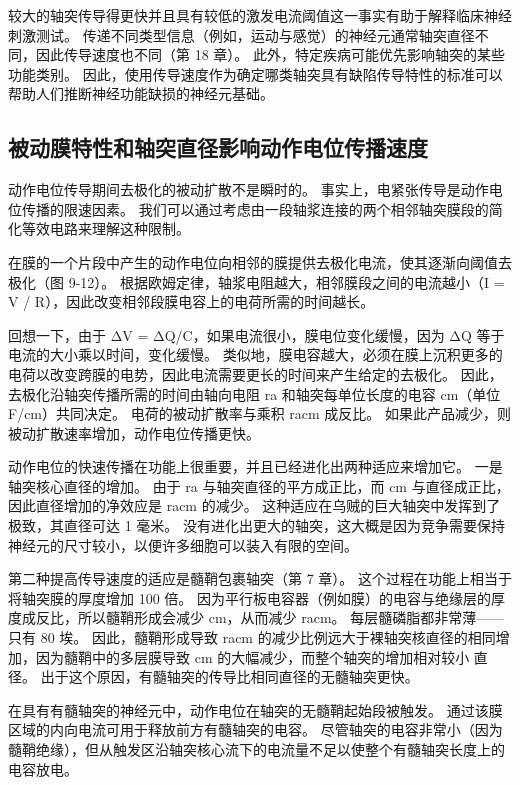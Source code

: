较大的轴突传导得更快并且具有较低的激发电流阈值这一事实有助于解释临床神经刺激测试。 传递不同类型信息（例如，运动与感觉）的神经元通常轴突直径不同，因此传导速度也不同（第 18 章）。 此外，特定疾病可能优先影响轴突的某些功能类别。 因此，使用传导速度作为确定哪类轴突具有缺陷传导特性的标准可以帮助人们推断神经功能缺损的神经元基础。

\subsection{被动膜特性和轴突直径影响动作电位传播速度}

动作电位传导期间去极化的被动扩散不是瞬时的。 事实上，电紧张传导是动作电位传播的限速因素。 我们可以通过考虑由一段轴浆连接的两个相邻轴突膜段的简化等效电路来理解这种限制。

在膜的一个片段中产生的动作电位向相邻的膜提供去极化电流，使其逐渐向阈值去极化（图 9-12）。 根据欧姆定律，轴浆电阻越大，相邻膜段之间的电流越小（I = V / R），因此改变相邻段膜电容上的电荷所需的时间越长。

回想一下，由于 ΔV = ΔQ/C，如果电流很小，膜电位变化缓慢，因为 ΔQ 等于电流的大小乘以时间，变化缓慢。 类似地，膜电容越大，必须在膜上沉积更多的电荷以改变跨膜的电势，因此电流需要更长的时间来产生给定的去极化。 因此，去极化沿轴突传播所需的时间由轴向电阻 ra 和轴突每单位长度的电容 cm（单位 F/cm）共同决定。 电荷的被动扩散率与乘积 racm 成反比。 如果此产品减少，则被动扩散速率增加，动作电位传播更快。

动作电位的快速传播在功能上很重要，并且已经进化出两种适应来增加它。 一是轴突核心直径的增加。 由于 ra 与轴突直径的平方成正比，而 cm 与直径成正比，因此直径增加的净效应是 racm 的减少。 这种适应在乌贼的巨大轴突中发挥到了极致，其直径可达 1 毫米。 没有进化出更大的轴突，这大概是因为竞争需要保持神经元的尺寸较小，以便许多细胞可以装入有限的空间。

第二种提高传导速度的适应是髓鞘包裹轴突（第 7 章）。 这个过程在功能上相当于将轴突膜的厚度增加 100 倍。 因为平行板电容器（例如膜）的电容与绝缘层的厚度成反比，所以髓鞘形成会减少 cm，从而减少 racm。 每层髓磷脂都非常薄——只有 80 埃。 因此，髓鞘形成导致 racm 的减少比例远大于裸轴突核直径的相同增加，因为髓鞘中的多层膜导致 cm 的大幅减少，而整个轴突的增加相对较小 直径。 出于这个原因，有髓轴突的传导比相同直径的无髓轴突更快。

在具有有髓轴突的神经元中，动作电位在轴突的无髓鞘起始段被触发。 通过该膜区域的内向电流可用于释放前方有髓轴突的电容。 尽管轴突的电容非常小（因为髓鞘绝缘），但从触发区沿轴突核心流下的电流量不足以使整个有髓轴突长度上的电容放电。

